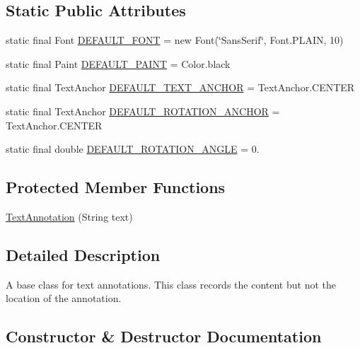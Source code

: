 \subsection*{Static Public Attributes}
\begin{DoxyCompactItemize}
\item 
static final Font \mbox{\hyperlink{classorg_1_1jfree_1_1chart_1_1annotations_1_1_text_annotation_ac78d6f928e48d518c88bb7be72b41051}{D\+E\+F\+A\+U\+L\+T\+\_\+\+F\+O\+NT}} = new Font(\char`\"{}Sans\+Serif\char`\"{}, Font.\+P\+L\+A\+IN, 10)
\item 
static final Paint \mbox{\hyperlink{classorg_1_1jfree_1_1chart_1_1annotations_1_1_text_annotation_ace6ccb84b2e3f7ab417755641b196075}{D\+E\+F\+A\+U\+L\+T\+\_\+\+P\+A\+I\+NT}} = Color.\+black
\item 
static final Text\+Anchor \mbox{\hyperlink{classorg_1_1jfree_1_1chart_1_1annotations_1_1_text_annotation_a78351d1e9a5ebb52caaeaef526c09644}{D\+E\+F\+A\+U\+L\+T\+\_\+\+T\+E\+X\+T\+\_\+\+A\+N\+C\+H\+OR}} = Text\+Anchor.\+C\+E\+N\+T\+ER
\item 
static final Text\+Anchor \mbox{\hyperlink{classorg_1_1jfree_1_1chart_1_1annotations_1_1_text_annotation_a13404c1f8c744292738d9e996a92215e}{D\+E\+F\+A\+U\+L\+T\+\_\+\+R\+O\+T\+A\+T\+I\+O\+N\+\_\+\+A\+N\+C\+H\+OR}} = Text\+Anchor.\+C\+E\+N\+T\+ER
\item 
static final double \mbox{\hyperlink{classorg_1_1jfree_1_1chart_1_1annotations_1_1_text_annotation_a16fb23f4d97d4d9dbc803ccc3bf073e6}{D\+E\+F\+A\+U\+L\+T\+\_\+\+R\+O\+T\+A\+T\+I\+O\+N\+\_\+\+A\+N\+G\+LE}} = 0.
\end{DoxyCompactItemize}
\subsection*{Protected Member Functions}
\begin{DoxyCompactItemize}
\item 
\mbox{\hyperlink{classorg_1_1jfree_1_1chart_1_1annotations_1_1_text_annotation_a18f534e2336106640e0174bb0694164c}{Text\+Annotation}} (String text)
\end{DoxyCompactItemize}


\subsection{Detailed Description}
A base class for text annotations. This class records the content but not the location of the annotation. 

\subsection{Constructor \& Destructor Documentation}
\mbox{\label{classorg_1_1jfree_1_1chart_1_1annotations_1_1_text_annotation_a18f534e2336106640e0174bb0694164c}} 
